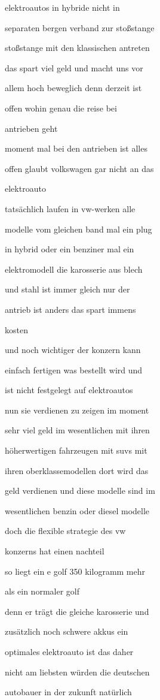 \documentclass[a4paper, 11pt]{book} %
\begin{document}
elektroautos in hybride nicht in

separaten bergen verband zur stoßstange

stoßstange mit den klassischen antreten

das spart viel geld und macht uns vor

allem hoch beweglich denn derzeit ist

offen wohin genau die reise bei

antrieben geht

moment mal bei den antrieben ist alles

offen glaubt volkswagen gar nicht an das

elektroauto

tatsächlich laufen in vw-werken alle

modelle vom gleichen band mal ein plug

in hybrid oder ein benziner mal ein

elektromodell die karosserie aus blech

und stahl ist immer gleich nur der

antrieb ist anders das spart immens

kosten

und noch wichtiger der konzern kann

einfach fertigen was bestellt wird und

ist nicht festgelegt auf elektroautos

nun sie verdienen zu zeigen im moment

sehr viel geld im wesentlichen mit ihren

höherwertigen fahrzeugen mit suvs mit

ihren oberklassemodellen dort wird das

geld verdienen und diese modelle sind im

wesentlichen benzin oder diesel modelle

doch die flexible strategie des vw

konzerns hat einen nachteil

so liegt ein e golf 350 kilogramm mehr

als ein normaler golf

denn er trägt die gleiche karosserie und

zusätzlich noch schwere akkus ein

optimales elektroauto ist das daher

nicht am liebsten würden die deutschen

autobauer in der zukunft natürlich
\end{document}
